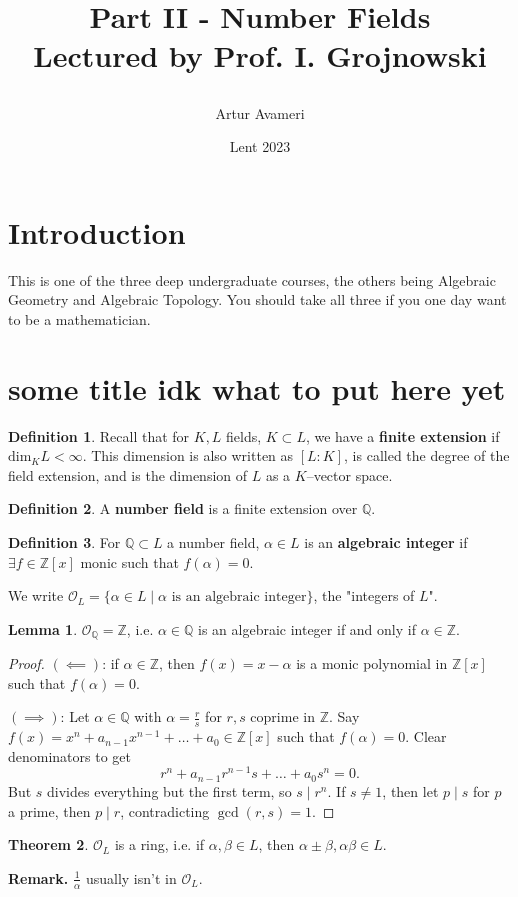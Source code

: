 \documentclass{article}
\title{Part II - Number Fields
    \\ \large
    Lectured by Prof. I. Grojnowski

}
\author{Artur Avameri}
\date{Lent 2023}
\theoremstyle{definition}
\newtheorem{theorem}{Theorem}[section]
\newtheorem{lemma}[theorem]{Lemma}
\newtheorem{defn}{Definition}[section]
\begin{document}
\maketitle
\tableofcontents
\newpage

\section{Introduction}

This is one of the three deep undergraduate courses, the others being Algebraic Geometry and Algebraic Topology. You should take all three if you one day want to be a mathematician.

\section{some title idk what to put here yet}
\begin{defn}
    Recall that for $K, L$ fields, $K \subset L$, we have a \textbf{finite extension} if $\text{dim}_{K} L < \infty$. This dimension is also written as $[L:K]$, is called the degree of the field extension, and is the dimension of $L$ as a $K$--vector space.
\end{defn}
\begin{defn}
    A \textbf{number field} is a finite extension over $\mathbb{Q}$.
\end{defn}
\begin{defn}
    For $\mathbb{Q} \subset L$ a number field, $\alpha \in L$ is an \textbf{algebraic integer} if $\exists f \in \mathbb{Z}[x]$ monic such that $f(\alpha)=0$. 
    \vspace{1mm}
    
    We write $\mathcal{O}_L = \{\alpha \in L \mid \alpha \text{ is an algebraic integer}\}$, the "integers of $L$".
\end{defn}
\begin{lemma}
    $\mathcal{O}_{\mathbb{Q}} = \mathbb{Z}$, i.e. $\alpha \in \mathbb{Q}$ is an algebraic integer if and only if $\alpha \in \mathbb{Z}$.
\end{lemma}
\begin{proof}
    $(\impliedby)$: if $\alpha \in \mathbb{Z}$, then $f(x)=x-\alpha$ is a monic polynomial in $\mathbb{Z}[x]$ such that $f(\alpha)=0$.
    \vspace{1mm}
    
    $(\implies)$: Let $\alpha \in \mathbb{Q}$ with $\alpha=\frac{r}{s}$ for $r,s$ coprime in $\mathbb{Z}$. Say $f(x)=x^n+a_{n-1}x^{n-1}+\ldots+a_0 \in \mathbb{Z}[x]$ such that $f(\alpha)=0$. Clear denominators to get \[
    r^n + a_{n-1}r^{n-1}s + \ldots + a_0s^n = 0.
    \] 
    But $s$ divides everything but the first term, so $s \mid r^n$. If $s \neq 1$, then let $p \mid s$ for $p$ a prime, then $p \mid r$, contradicting $\gcd(r,s)=1$.
\end{proof}
\begin{theorem}
    $\mathcal{O}_L$ is a ring, i.e. if $\alpha,\beta \in L$, then $\alpha \pm \beta, \alpha \beta \in L$.
\end{theorem}
\textbf{Remark.} $\frac{1}{\alpha}$ usually isn't in $\mathcal{O}_L$.
\vspace{1mm}
\end{document}
